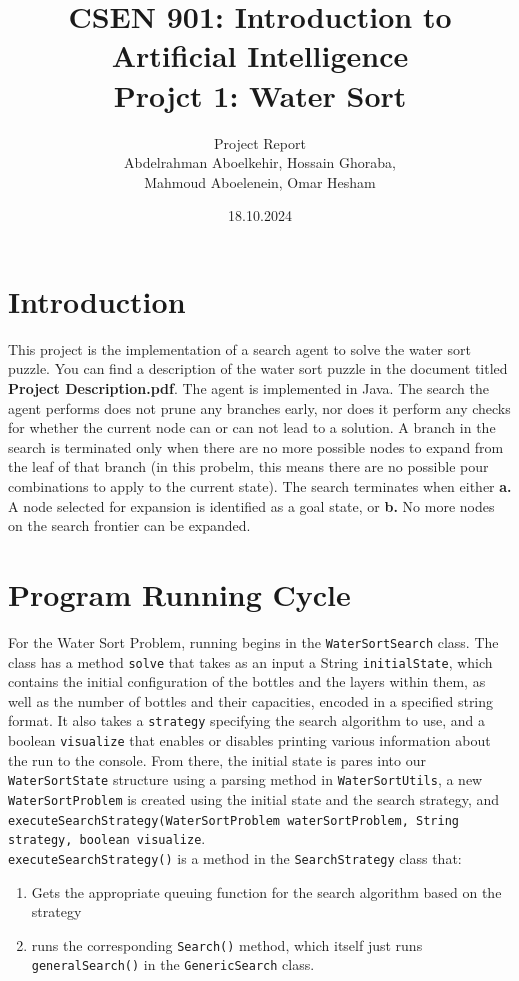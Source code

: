 \documentclass{article}
\title{CSEN 901: Introduction to Artificial Intelligence \\Projct 1: Water Sort}
\author{Project Report \vspace{24pt} \\ Abdelrahman Aboelkehir, Hossain Ghoraba, \\ Mahmoud Aboelenein, Omar Hesham}
\date{18.10.2024}
\begin{document}
\maketitle

\section{Introduction}
This project is the implementation of a search agent to solve the water sort puzzle. You can find a description of the water sort puzzle in the document titled \textbf{Project Description.pdf}. The agent is implemented in Java. The search the agent performs does not prune any branches early, nor does it perform any checks for whether the current node can or can not lead to a solution. A branch in the search is terminated only when there are no more possible nodes to expand from the leaf of that branch (in this probelm, this means there are no possible pour combinations to apply to the current state). The search terminates when either \textbf{a.} A node selected for expansion is identified as a goal state, or \textbf{b.} No more nodes on the search frontier can be expanded.


\section{Program Running Cycle}

For the Water Sort Problem, running begins in the \texttt{WaterSortSearch} class. The class has a method \texttt{solve} that takes as an input a String \texttt{initialState}, which contains the initial configuration of the bottles and the layers within them, as well as the number of bottles and their capacities, encoded in a specified string format. It also takes a \texttt{strategy} specifying the search algorithm to use, and a boolean \texttt{visualize} that enables or disables printing various information about the run to the console. From there, the initial state is pares into our \texttt{WaterSortState} structure using a parsing method in \texttt{WaterSortUtils}, a new \texttt{WaterSortProblem} is created using the initial state and the search strategy, and \texttt{executeSearchStrategy(WaterSortProblem waterSortProblem, String strategy, boolean visualize}. \\

\texttt{executeSearchStrategy()} is a method in the \texttt{SearchStrategy} class that:

\begin{enumerate}
\item Gets the appropriate queuing function for the search algorithm based on the strategy
\item runs the corresponding \texttt{Search()} method, which itself just runs \texttt{generalSearch()} in the \texttt{GenericSearch} class.
\end{enumerate}
\end{document}
